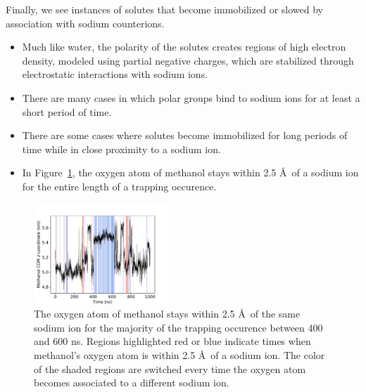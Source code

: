 \documentclass{article}
\begin{document}
  Finally, we see instances of solutes that become immobilized or slowed by 
  association with sodium counterions. 
  \begin{itemize}
    \item Much like water, the polarity of the solutes creates regions of high
    electron density, modeled using partial negative charges, which are stabilized
    through electrostatic interactions with sodium ions.
    \item There are many cases in which polar groups bind to sodium ions for at
    least a short period of time. 
    \item There are some cases where solutes become immobilized for long periods
    of time while in close proximity to a sodium ion.
    \item In Figure~\ref{fig:na_met_trace}, the oxygen atom of methanol stays
    within 2.5 \AA~of a sodium ion for the entire length of a trapping occurence.
  \end{itemize}
  
  \begin{figure}[!htb]
  \centering
  \includegraphics[width=0.45\textwidth]{na_met_trace.pdf}  %
  \caption{The oxygen atom of methanol stays within 2.5 \AA~of the same sodium ion for
  the majority of the trapping occurence between 400 and 600 ns. Regions
  highlighted red or blue indicate times when methanol's oxygen atom is within 
  2.5 \AA~of a sodium ion. The color of the shaded regions are switched every time
  the oxygen atom becomes associated to a different sodium ion.}\label{fig:na_met_trace}
  \end{figure}
\end{document}
